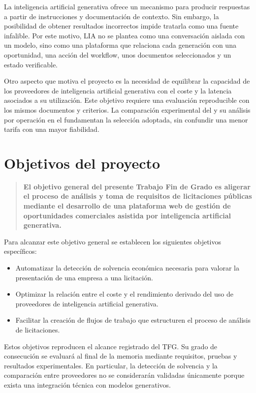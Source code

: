 La inteligencia artificial generativa ofrece un mecanismo para producir
respuestas a partir de instrucciones y documentación de contexto. Sin embargo,
la posibilidad de obtener resultados incorrectos impide tratarla como una
fuente infalible. Por este motivo, LIA no se plantea como una conversación
aislada con un modelo, sino como una plataforma que relaciona cada generación
con una oportunidad, una acción del workflow, unos documentos seleccionados y
un estado verificable.

Otro aspecto que motiva el proyecto es la necesidad de equilibrar la capacidad
de los proveedores de inteligencia artificial generativa con el coste y la
latencia asociados a su utilización. Este objetivo requiere una evaluación
reproducible con los mismos documentos y criterios. La comparación experimental
del  y su análisis por operación en el
 fundamentan la selección adoptada, sin confundir
una menor tarifa con una mayor fiabilidad.

\section{Objetivos del proyecto}

\begin{quote}
\bfseries
El objetivo general del presente Trabajo Fin de Grado es aligerar el proceso de
análisis y toma de requisitos de licitaciones públicas mediante el desarrollo
de una plataforma web de gestión de oportunidades comerciales asistida por
inteligencia artificial generativa.
\end{quote}

Para alcanzar este objetivo general se establecen los siguientes objetivos
específicos:

\begin{itemize}
  \item Automatizar la detección de solvencia económica necesaria para valorar
        la presentación de una empresa a una licitación.
  \item Optimizar la relación entre el coste y el rendimiento derivado del uso
        de proveedores de inteligencia artificial generativa.
  \item Facilitar la creación de flujos de trabajo que estructuren el proceso
        de análisis de licitaciones.
\end{itemize}

Estos objetivos reproducen el alcance registrado del TFG. Su grado de
consecución se evaluará al final de la memoria mediante requisitos, pruebas y
resultados experimentales. En particular, la detección de solvencia y la
comparación entre proveedores no se considerarán validadas únicamente porque
exista una integración técnica con modelos generativos.


